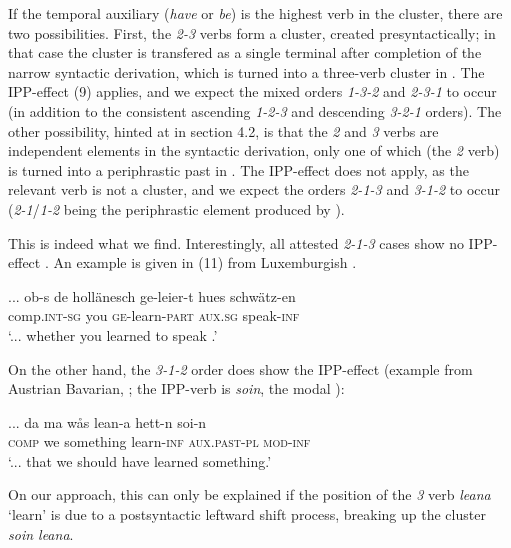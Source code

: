 \documentclass[output=paper]{LSP/langsci}
\begin{document}
If the temporal auxiliary (\textit{have} or \textit{be}) is the highest verb in the cluster, there are two possibilities. First, the \textit{2-3} verbs form a cluster, created presyntactically; in that case the cluster is transfered as a single terminal after completion of the narrow syntactic derivation, which is turned into a three-verb cluster in . The IPP-effect (9) applies, and we expect the mixed orders \textit{1-3-2} and \textit{2-3-1} to occur (in addition to the consistent ascending \textit{1-2-3} and descending \textit{3-2-1} orders). The other possibility, hinted at in section 4.2, is that the \textit{2} and \textit{3} verbs are independent elements in the syntactic derivation, only one of which (the \textit{2} verb) is turned into a periphrastic past in . The IPP-effect does not apply, as the relevant verb is not a cluster, and we expect the orders \textit{2-1-3} and \textit{3-1-2} to occur (\textit{2-1}/\textit{1-2} being the periphrastic element produced by ). 

This is indeed what we find. Interestingly, all attested \textit{2-1-3} cases show no IPP-effect \citep{Zwart2007,Salzmann2016}. An example is given in (11) from Luxemburgish \citep[95]{Bruch1973}.

\settowidth{}
\ea%
\let\eachwordone=\small
\let\eachwordtwo=\small
\label{ex:zwart:11}
    \gll 	  ...  ob-s    de  hollänesch  ge-leier-t  hues    schwätz-en  \\
   {}  comp.\textsc{int-sg}  you      \textsc{ge}{}-learn-\textsc{part}  \textsc{aux.sg}    speak-\textsc{inf}\\
\glt     ‘... whether you learned to speak .’        
\z


On the other hand, the \textit{3-1-2} order does show the IPP-effect (example from Austrian Bavarian, \citealt[278]{Patocka1997}; the IPP-verb is \textit{soin}, the modal ):

\settowidth{}
\ea%
    \label{ex:zwart:12}
    \gll	  ...  da  ma  wås    lean-a    hett-n    soi-n\\
                  {}  \textsc{comp}  we  something  learn-\textsc{inf}  \textsc{aux.past-pl}  \textsc{mod-inf}\\
    ‘... that we should have learned something.’      
\z


On our approach, this can only be explained if the position of the \textit{3} verb \textit{leana} ‘learn’ is due to a postsyntactic leftward shift process, breaking up the cluster \textit{soin leana}.
\end{document}
